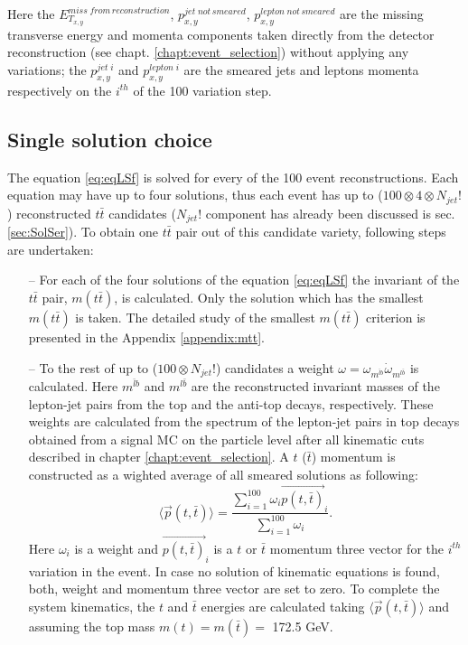 Here the $E^{miss \; from \, reconstruction}_{T_{x,y}}$, $p^{jet \; not\,smeared}_{x,y}$, $p^{lepton\;not\,smeared}_{x,y}$ are the missing transverse energy and momenta
components taken directly from the detector reconstruction (see chapt. \ref{chapt:event_selection}) without applying any variations; the $p^{jet\;i}_{x,y}$ and $p^{lepton\;i}_{x,y}$
are the smeared jets and leptons momenta respectively on the $i^{th}$ of the 100 variation step.

\subsection{Single solution choice}

The equation \ref{eq:eqLSf} is solved for every of the 100 event reconstructions. Each equation may have up to four solutions, thus each event
has up to ($100 \otimes 4 \otimes N_{jet}!$) reconstructed $t\bar{t}$ candidates ($N_{jet}!$ component has already been discussed is sec. \ref{sec:SolSer}). 
To obtain one $t\bar{t}$ pair out of this candidate variety, following steps are undertaken:

\begin{itemize}
 \item [--] For each of the four solutions of the equation \ref{eq:eqLSf} the invariant of the $t\bar{t}$ pair, $m(t\bar{t})$, is calculated. Only
 the solution which has the smallest $m(t\bar{t})$ is taken. The detailed study of the smallest $m(t\bar{t})$ criterion is presented in the Appendix \ref{appendix:mtt}. 
 \item [--] To the rest of up to ($100 \otimes N_{jet}!$) candidates a weight $\omega = \omega_{m^{\bar{l}b}} \dot \omega_{m^{l\bar{b}}}$
 is calculated. Here $m^{\bar{l}b}$ and $m^{l\bar{b}}$ are the reconstructed invariant masses of the lepton-jet pairs from the top and the anti-top 
 decays, respectively. These weights are calculated from the spectrum of the lepton-jet pairs in top decays obtained from a signal MC on the 
 particle level after all kinematic cuts described in chapter \ref{chapt:event_selection}. A $t$ ($\bar{t}$) momentum is constructed as a wighted 
 average of all smeared solutions as following:
 \begin{equation}
  \langle{\vec{p}(t,\bar{t})}\rangle = \frac{\sum\limits_{i=1}^{100} \omega_{i} \vec{p(t,\bar{t})}_i}{\sum\limits_{i=1}^{100} \omega_i}.
 \end{equation}
 Here $\omega_i$ is a weight and $\vec{p(t, \bar{t})}_{i}$ is a $t$ or $\bar{t}$ momentum three vector for the $i^{th}$ variation in the event. 
 In case no solution of kinematic equations is found, both, weight and momentum three vector are set to zero. To complete the system kinematics,
 the $t$ and $\bar{t}$ energies are calculated taking $\langle{\vec{p}(t,\bar{t})}\rangle$ and assuming the top mass $m(t) = m(\bar{t}) = $ 172.5 GeV.
\end{itemize}

